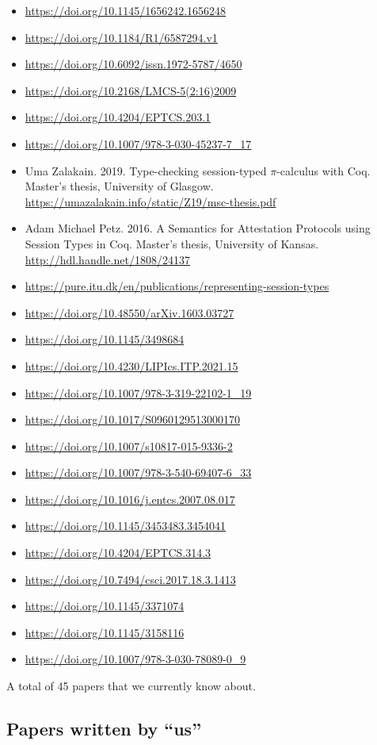 \begin{itemize}
\item \url{https://doi.org/10.1145/1656242.1656248}
\item \url{https://doi.org/10.1184/R1/6587294.v1}
\item \url{https://doi.org/10.6092/issn.1972-5787/4650}
\item \url{https://doi.org/10.2168/LMCS-5(2:16)2009}
\item \url{https://doi.org/10.4204/EPTCS.203.1}
\item \url{https://doi.org/10.1007/978-3-030-45237-7_17}
\item Uma Zalakain. 2019. Type-checking session-typed $\pi$-calculus with Coq. Master's thesis, University of Glasgow. \url{https://umazalakain.info/static/Z19/msc-thesis.pdf}
\item Adam Michael Petz. 2016. A Semantics for Attestation Protocols using Session Types in Coq. Master's thesis, University of Kansas. \url{http://hdl.handle.net/1808/24137}
\item \url{https://pure.itu.dk/en/publications/representing-session-types}
\item \url{https://doi.org/10.48550/arXiv.1603.03727}
\item \url{https://doi.org/10.1145/3498684}
\item \url{https://doi.org/10.4230/LIPIcs.ITP.2021.15}
\item \url{https://doi.org/10.1007/978-3-319-22102-1_19}
\item \url{https://doi.org/10.1017/S0960129513000170}
\item \url{https://doi.org/10.1007/s10817-015-9336-2}
\item \url{https://doi.org/10.1007/978-3-540-69407-6_33}
\item \url{https://doi.org/10.1016/j.entcs.2007.08.017}
\item \url{https://doi.org/10.1145/3453483.3454041}
\item \url{https://doi.org/10.4204/EPTCS.314.3}
\item \url{https://doi.org/10.7494/csci.2017.18.3.1413}
\item \url{https://doi.org/10.1145/3371074}
\item \url{https://doi.org/10.1145/3158116}
\item \url{https://doi.org/10.1007/978-3-030-78089-0_9}
\end{itemize}

A total of 45 papers that we currently know about.

\subsection{Papers written by ``us''}
